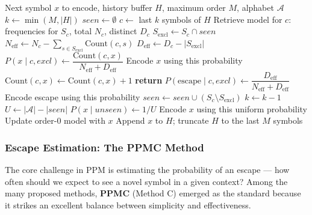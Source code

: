 \begin{algorithm}
\caption{PPM Prediction/Encoding Process (Simplified, for a Single Symbol)}
\begin{algorithmic}[1]
\Require Next symbol $x$ to encode, history buffer $H$, maximum order $M$,
         alphabet $\mathcal{A}$
\State $k \gets \min(M, |H|)$ 
\State $seen \gets \emptyset$ 
    \State $c \gets$ last $k$ symbols of $H$
    \State Retrieve model for $c$: frequencies for $S_c$, total $N_c$, distinct $D_c$
    \State $S_{\mathrm{excl}} \gets S_c \cap seen$
    \State $N_{\mathrm{eff}} \gets N_c - \sum_{s \in S_{\mathrm{excl}}} \text{Count}(c,s)$
    \State $D_{\mathrm{eff}} \gets D_c - |S_{\mathrm{excl}}|$
        \State $P(x \mid c, \mathit{excl}) \gets
               \dfrac{\text{Count}(c,x)}{N_{\mathrm{eff}} + D_{\mathrm{eff}}}$
        \State Encode $x$ using this probability
        \State $\text{Count}(c,x) \gets \text{Count}(c,x) + 1$
        \State \textbf{return}
    \Else
        \State $P(\text{escape} \mid c, \mathit{excl}) \gets
               \dfrac{D_{\mathrm{eff}}}{N_{\mathrm{eff}} + D_{\mathrm{eff}}}$
        \State Encode escape using this probability
        \State $seen \gets seen \cup (S_c \setminus S_{\mathrm{excl}})$
        \State $k \gets k - 1$
    \EndIf
\EndWhile
{} 
    \State $U \gets |\mathcal{A}| - |seen|$ 
    \State $P(x \mid \mathit{unseen}) \gets 1/U$
    \State Encode $x$ using this uniform probability
    \State Update order-0 model with $x$
\EndIf
\State Append $x$ to $H$; truncate $H$ to the last $M$ symbols
\end{algorithmic}
\end{algorithm}

\subsubsection{Escape Estimation: The PPMC Method}

The core challenge in PPM is estimating the probability of an escape — how often
should we expect to see a novel symbol in a given context? Among the many proposed
methods, \textbf{PPMC} (Method C) emerged as the standard because it strikes an
excellent balance between simplicity and effectiveness.

